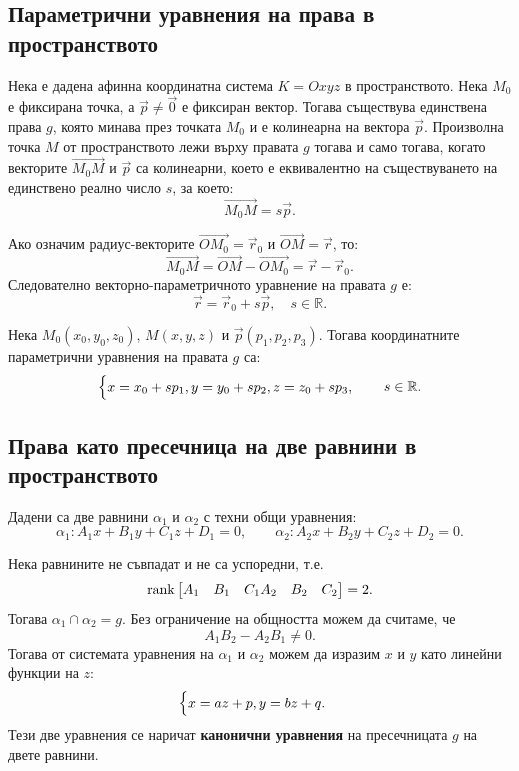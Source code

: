 \documentclass{article}
\renewcommand{\\}{\newline}
\begin{document}
\subsection{Параметрични уравнения на права в пространството}

Нека е дадена афинна координатна система $K = Oxyz$ в пространството. Нека $M_0$ е фиксирана точка, а $\vec{p} \neq \vec{0}$ е фиксиран вектор. Тогава съществува единствена права $g$, която минава през точката $M_0$ и е колинеарна на вектора $\vec{p}$. Произволна точка $M$ от пространството лежи върху правата $g$ тогава и само тогава, когато векторите $\overrightarrow{M_0M}$ и $\vec{p}$ са колинеарни, което е еквивалентно на съществуването на единствено реално число $s$, за което:
\[\overrightarrow{M_0M} = s\vec{p}.\]

Ако означим радиус-векторите $\overrightarrow{OM_0} = \vec{r}_0$ и $\overrightarrow{OM} = \vec{r}$, то:
\[\overrightarrow{M_0M} = \overrightarrow{OM} - \overrightarrow{OM_0} = \vec{r} - \vec{r}_0.\]
Следователно векторно-параметричното уравнение на правата $g$ е:
\[\vec{r} = \vec{r}_0 + s\vec{p}, \quad s \in \mathbb{R}.\]

Нека $M_0(x_0, y_0, z_0)$, $M(x, y, z)$ и $\vec{p}(p_1, p_2, p_3)$. Тогава координатните параметрични уравнения на правата $g$ са:
\[
\begin{cases}
x = x_0 + s p_1, \\
y = y_0 + s p_2, \\
z = z_0 + s p_3,
\end{cases}
\quad s \in \mathbb{R}.
\]

\subsection{Права като пресечница на две равнини в пространството}

Дадени са две равнини $\alpha_1$ и $\alpha_2$ с техни общи уравнения:
\[
\alpha_1: A_1x + B_1y + C_1z + D_1 = 0, \qquad
\alpha_2: A_2x + B_2y + C_2z + D_2 = 0.
\]

Нека равнините не съвпадат и не са успоредни, т.е.
\[
\operatorname{rank}
\begin{bmatrix}
A_1 & B_1 & C_1 \\
A_2 & B_2 & C_2
\end{bmatrix} = 2.
\]
Тогава $\alpha_1 \cap \alpha_2 = g$. Без ограничение на общността можем да считаме, че
\[A_1B_2 - A_2B_1 \neq 0.\]
Тогава от системата уравнения на $\alpha_1$ и $\alpha_2$ можем да изразим $x$ и $y$ като линейни функции на $z$:
\[
\begin{cases}
x = a z + p, \\
y = b z + q.
\end{cases}
\]
Тези две уравнения се наричат \textbf{канонични уравнения} на пресечницата $g$ на двете равнини.
\end{document}
